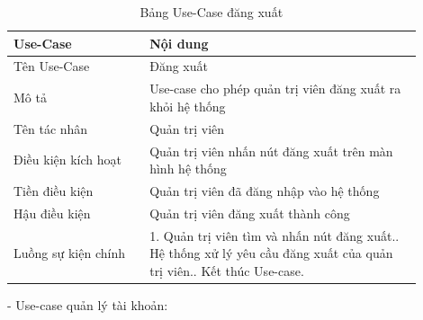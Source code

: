 \begin{longtable}[htp]{ |m{0.3\linewidth}|m{0.6\linewidth}|}
 \caption{Bảng Use-Case đăng xuất \label{logout}}\\
 \hline
 Use-Case & Nội dung \\
 \hline
 Tên Use-Case & Đăng xuất \\
 \hline
 Mô tả & Use-case cho phép quản trị viên đăng xuất ra khỏi hệ thống\\
 \hline
 Tên tác nhân & Quản trị viên\\
 \hline
 Điều kiện kích hoạt & Quản trị viên nhấn nút đăng xuất trên màn hình hệ thống\\
 \hline
 Tiền điều kiện & Quản trị viên đã đăng nhập vào hệ thống\\
 \hline
 Hậu điều kiện & Quản trị viên đăng xuất thành công\\
 \hline
 Luồng sự kiện chính & 
 1. Quản trị viên tìm và nhấn nút đăng xuất.\newline
 2. Hệ thống xử lý yêu cầu đăng xuất của quản trị viên.\newline
 3. Kết thúc Use-case.	
 \\
 \hline
\end{longtable}

- Use-case quản lý tài khoản:

